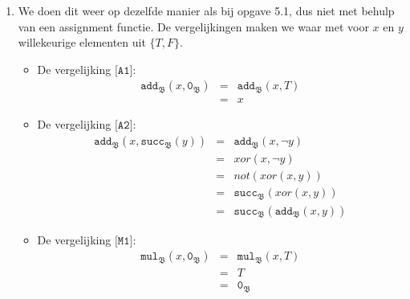 \documentclass[a4paper,11pt]{article}
\begin{document}
\begin{enumerate}

\item %
We doen dit weer op dezelfde manier als bij opgave 5.1, dus niet met behulp
van een assignment functie. De vergelijkingen maken we waar met voor $x$ en
$y$ willekeurige elementen uit $\{T,F\}$.

\begin{itemize}

\item{De vergelijking $\texttt{[A1]}$:}
\begin{eqnarray*}
\texttt{add}_{\mathfrak{B}}(x, \texttt{0}_{\mathfrak{B}}) & = & \texttt{add}_{\mathfrak{B}}(x, T) \\
                                                          & = & x
\end{eqnarray*}

\item{De vergelijking $\texttt{[A2]}$:}
\begin{eqnarray*}
\texttt{add}_{\mathfrak{B}}(x, \texttt{succ}_{\mathfrak{B}}(y)) & = & \texttt{add}_{\mathfrak{B}}(x, \neg y) \\
                                                                & = & xor(x, \neg y) \\
                                                                & = & not(xor(x,y)) \\
                                                                & = & \texttt{succ}_{\mathfrak{B}}(xor(x,y)) \\
                                                                & = & \texttt{succ}_{\mathfrak{B}}(\texttt{add}_{\mathfrak{B}}(x, y))
\end{eqnarray*}

\item{De vergelijking $\texttt{[M1]}$:}
\begin{eqnarray*}
\texttt{mul}_{\mathfrak{B}}(x, \texttt{0}_{\mathfrak{B}}) & = & \texttt{mul}_{\mathfrak{B}}(x, T) \\
                                                          & = & T \\
                                                          & = & \texttt{0}_{\mathfrak{B}}
\end{eqnarray*}


\end{itemize}
\end{enumerate}
\end{document}
